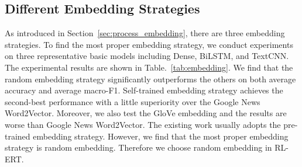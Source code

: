 \documentclass[review]{elsarticle}
\begin{document}
\subsection{Different Embedding Strategies}
As introduced in Section~\ref{sec:process_embedding}, there are three embedding strategies. To find the most proper embedding strategy, we conduct experiments on three representative basic models including Dense, BiLSTM, and TextCNN. The experimental results are shown in Table.~\ref{tab:embedding}. We find that the random embedding strategy significantly outperforms the others on both average accuracy and average macro-F1. Self-trained embedding strategy achieves the second-best performance with a little superiority over the Google News Word2Vector. Moreover, we also test the GloVe embedding and the results are worse than Google News Word2Vector. The existing work usually adopts the pre-trained embedding strategy. However, we find that the most proper embedding strategy is random embedding. Therefore we choose random embedding in RL-ERT.

\begin{table}[htbp]
	\caption{Results of Different Embedding Strategies}
	\centering
	\label{tab:embedding}
\end{table}
\end{document}
